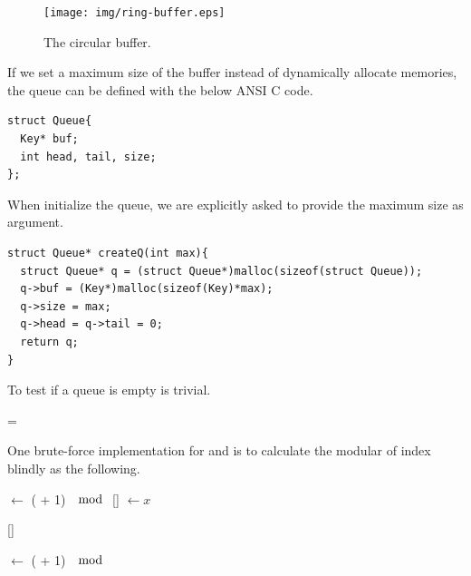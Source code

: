 \documentclass{article}
\begin{document}
\begin{figure}[htbp]
 \centering
 \texttt{[image: img/ring-buffer.eps]}
 \caption{The circular buffer.} \label{fig:circular-buffer}
\end{figure}

If we set a maximum size of the buffer instead of dynamically allocate
memories, the queue can be defined with the below ANSI C code.

\lstset{language=C}
\begin{lstlisting}
struct Queue{
  Key* buf;
  int head, tail, size;
};
\end{lstlisting}

When initialize the queue, we are explicitly asked to provide the maximum
size as argument.

\begin{lstlisting}
struct Queue* createQ(int max){
  struct Queue* q = (struct Queue*)malloc(sizeof(struct Queue));
  q->buf = (Key*)malloc(sizeof(Key)*max);
  q->size = max;
  q->head = q->tail = 0;
  return q;
}
\end{lstlisting}

To test if a queue is empty is trivial.

\begin{algorithmic}
  \State \Return {} = 
\EndFunction
\end{algorithmic}

One brute-force implementation for  and 
is to calculate the modular of index blindly as the following.

\begin{algorithmic}
    \State {} $\gets $ ( + 1) $\mod$ 
    \State {}[] $\gets x$
  \EndIf
\EndFunction
\end{algorithmic}

\begin{algorithmic}
    \State \Return {}[]
  \EndIf
\EndFunction
\end{algorithmic}

\begin{algorithmic}
    \State {} $\gets $ ( + 1) $\mod$ 
  \EndIf
\EndFunction
\end{algorithmic}
\end{document}
